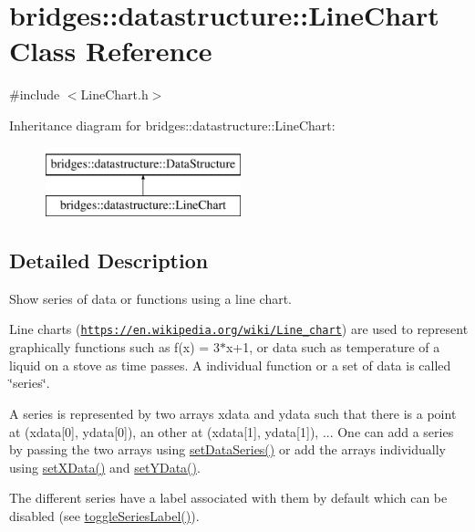 \hypertarget{classbridges_1_1datastructure_1_1_line_chart}{}\section{bridges\+:\+:datastructure\+:\+:Line\+Chart Class Reference}
\label{classbridges_1_1datastructure_1_1_line_chart}


{\ttfamily \#include $<$Line\+Chart.\+h$>$}

Inheritance diagram for bridges\+:\+:datastructure\+:\+:Line\+Chart\+:\begin{figure}[H]
\begin{center}
\leavevmode
\includegraphics[height=2.000000cm]{classbridges_1_1datastructure_1_1_line_chart}
\end{center}
\end{figure}


\subsection{Detailed Description}
Show series of data or functions using a line chart. 

Line charts (\href{https://en.wikipedia.org/wiki/Line_chart}{\tt https\+://en.\+wikipedia.\+org/wiki/\+Line\+\_\+chart}) are used to represent graphically functions such as f(x) = 3$\ast$x+1, or data such as temperature of a liquid on a stove as time passes. A individual function or a set of data is called \char`\"{}series\char`\"{}.

A series is represented by two arrays xdata and ydata such that there is a point at (xdata\mbox{[}0\mbox{]}, ydata\mbox{[}0\mbox{]}), an other at (xdata\mbox{[}1\mbox{]}, ydata\mbox{[}1\mbox{]}), ... One can add a series by passing the two arrays using \mbox{\hyperlink{classbridges_1_1datastructure_1_1_line_chart_acb763ea4b2d0f27c73edc3861cc51fbb}{set\+Data\+Series()}} or add the arrays individually using \mbox{\hyperlink{classbridges_1_1datastructure_1_1_line_chart_aa9959489d71e31645f561c4481f050d2}{set\+X\+Data()}} and \mbox{\hyperlink{classbridges_1_1datastructure_1_1_line_chart_a861370f3f7b32cc1a9347727d084d307}{set\+Y\+Data()}}.

The different series have a label associated with them by default which can be disabled (see \mbox{\hyperlink{classbridges_1_1datastructure_1_1_line_chart_a21031cd026426ab91307626ce9651c03}{toggle\+Series\+Label()}}).

